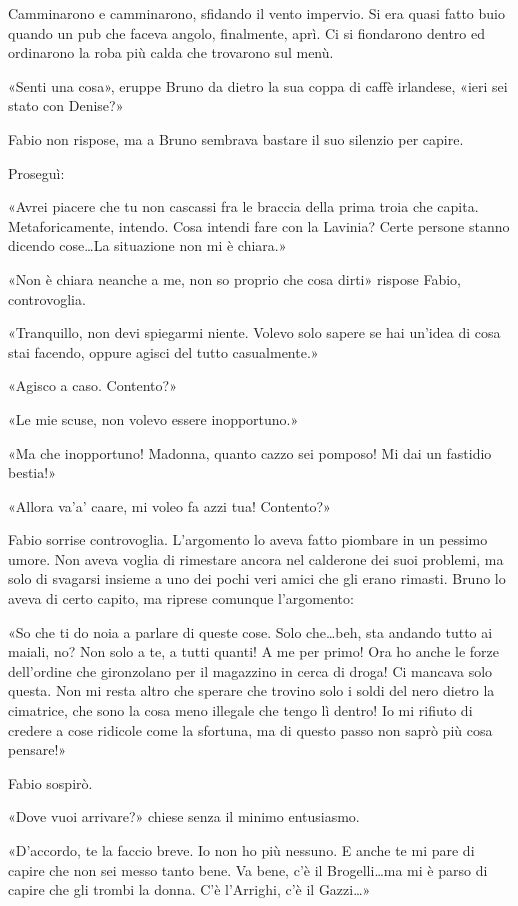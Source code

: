 Camminarono e camminarono, sfidando il vento impervio. Si era quasi fatto buio quando un pub che faceva angolo, finalmente, aprì. Ci si fiondarono dentro ed ordinarono la roba più calda che trovarono sul menù.

«Senti una cosa», eruppe Bruno da dietro la sua coppa di caffè irlandese, «ieri sei stato con Denise?»

Fabio non rispose, ma a Bruno sembrava bastare il suo silenzio per capire.

Proseguì:

«Avrei piacere che tu non cascassi fra le braccia della prima troia che capita. Metaforicamente, intendo. Cosa intendi fare con la Lavinia? Certe persone stanno dicendo cose\ldots La situazione non mi è chiara.»

«Non è chiara neanche a me, non so proprio che cosa dirti» rispose Fabio, controvoglia.

«Tranquillo, non devi spiegarmi niente. Volevo solo sapere se hai un'idea di cosa stai facendo, oppure agisci del tutto casualmente.»

«Agisco a caso. Contento?»

«Le mie scuse, non volevo essere inopportuno.»

«Ma che inopportuno! Madonna, quanto cazzo sei pomposo! Mi dai un fastidio bestia!»

«Allora va'a' caare, mi voleo fa \textsc{}azzi tua! Contento?»

Fabio sorrise controvoglia. L'argomento lo aveva fatto piombare in un pessimo umore. Non aveva voglia di rimestare ancora nel calderone dei suoi problemi, ma solo di svagarsi insieme a uno dei pochi veri amici che gli erano rimasti. Bruno lo aveva di certo capito, ma riprese comunque l'argomento:

«So che ti do noia a parlare di queste cose. Solo che\ldots beh, sta andando tutto ai maiali, no? Non solo a te, a tutti quanti! A me per primo! Ora ho anche le forze dell'ordine che gironzolano per il magazzino in cerca di droga! Ci mancava solo questa. Non mi resta altro che sperare che trovino solo i soldi del nero dietro la cimatrice, che sono la cosa meno illegale che tengo lì dentro! Io mi rifiuto di credere a cose ridicole come la sfortuna, ma di questo passo non saprò più cosa pensare!»

Fabio sospirò.

«Dove vuoi arrivare?» chiese senza il minimo entusiasmo.

«D'accordo, te la faccio breve. Io non ho più nessuno. E anche te mi pare di capire che non sei messo tanto bene. Va bene, c'è il Brogelli\ldots ma mi è parso di capire che gli trombi la donna. C'è l'Arrighi, c'è il Gazzi\ldots»

